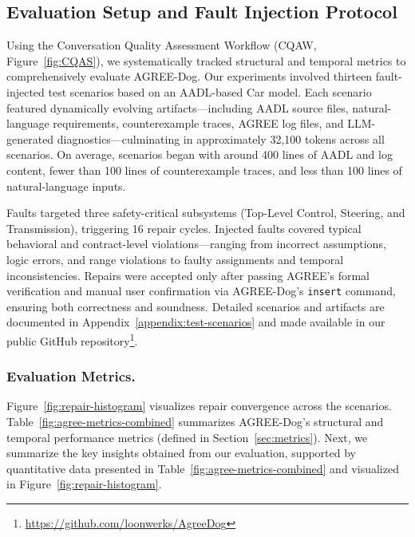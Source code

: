 

\subsection{Evaluation Setup and Fault Injection Protocol}

Using the Conversation Quality Assessment Workflow (CQAW, Figure~\ref{fig:CQAS}), we systematically tracked structural and temporal metrics to comprehensively evaluate AGREE-Dog. Our experiments involved thirteen fault-injected test scenarios based on an AADL-based Car model. Each scenario featured dynamically evolving artifacts—including AADL source files, natural-language requirements, counterexample traces, AGREE log files, and LLM-generated diagnostics—culminating in approximately 32,100 tokens across all scenarios. On average, scenarios began with around 400 lines of AADL and log content, fewer than 100 lines of counterexample traces, and less than 100 lines of natural-language inputs.

Faults targeted three safety-critical subsystems (Top-Level Control, Steering, and Transmission), triggering 16 repair cycles. Injected faults covered typical behavioral and contract-level violations—ranging from incorrect assumptions, logic errors, and range violations to faulty assignments and temporal inconsistencies. Repairs were accepted only after passing AGREE's formal verification and manual user confirmation via AGREE-Dog’s \texttt{insert} command, ensuring both correctness and soundness. Detailed scenarios and artifacts are documented in Appendix~\ref{appendix:test-scenarios} and made available in our public GitHub repository\footnote{\url{https://github.com/loonwerks/AgreeDog}}. 




\subsubsection*{Evaluation Metrics.}
Figure~\ref{fig:repair-histogram} visualizes repair convergence across the scenarios. Table~\ref{fig:agree-metrics-combined} summarizes AGREE-Dog’s structural and temporal performance metrics (defined in Section~\ref{sec:metrics}).  Next, we summarize the key insights obtained from our evaluation, supported by quantitative data presented in Table~\ref{fig:agree-metrics-combined} and visualized in Figure~\ref{fig:repair-histogram}.
